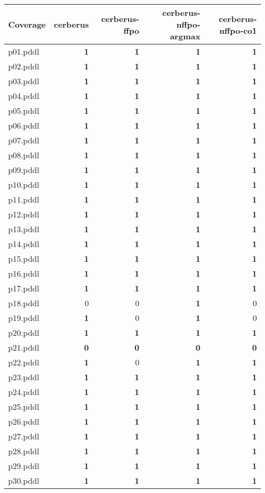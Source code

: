 \documentclass{article}
\begin{document}
\begin{tabular}{@{}lrrrr@{}}
Coverage & cerberus & cerberus-ffpo & cerberus-nffpo-argmax & cerberus-nffpo-co1 \\
\midrule
p01.pddl & \textbf{1} & \textbf{1} & \textbf{1} & \textbf{1} \\
p02.pddl & \textbf{1} & \textbf{1} & \textbf{1} & \textbf{1} \\
p03.pddl & \textbf{1} & \textbf{1} & \textbf{1} & \textbf{1} \\
p04.pddl & \textbf{1} & \textbf{1} & \textbf{1} & \textbf{1} \\
p05.pddl & \textbf{1} & \textbf{1} & \textbf{1} & \textbf{1} \\
p06.pddl & \textbf{1} & \textbf{1} & \textbf{1} & \textbf{1} \\
p07.pddl & \textbf{1} & \textbf{1} & \textbf{1} & \textbf{1} \\
p08.pddl & \textbf{1} & \textbf{1} & \textbf{1} & \textbf{1} \\
p09.pddl & \textbf{1} & \textbf{1} & \textbf{1} & \textbf{1} \\
p10.pddl & \textbf{1} & \textbf{1} & \textbf{1} & \textbf{1} \\
p11.pddl & \textbf{1} & \textbf{1} & \textbf{1} & \textbf{1} \\
p12.pddl & \textbf{1} & \textbf{1} & \textbf{1} & \textbf{1} \\
p13.pddl & \textbf{1} & \textbf{1} & \textbf{1} & \textbf{1} \\
p14.pddl & \textbf{1} & \textbf{1} & \textbf{1} & \textbf{1} \\
p15.pddl & \textbf{1} & \textbf{1} & \textbf{1} & \textbf{1} \\
p16.pddl & \textbf{1} & \textbf{1} & \textbf{1} & \textbf{1} \\
p17.pddl & \textbf{1} & \textbf{1} & \textbf{1} & \textbf{1} \\
p18.pddl & 0 & 0 & \textbf{1} & 0 \\
p19.pddl & \textbf{1} & 0 & \textbf{1} & 0 \\
p20.pddl & \textbf{1} & \textbf{1} & \textbf{1} & \textbf{1} \\
p21.pddl & \textbf{0} & \textbf{0} & \textbf{0} & \textbf{0} \\
p22.pddl & \textbf{1} & 0 & \textbf{1} & \textbf{1} \\
p23.pddl & \textbf{1} & \textbf{1} & \textbf{1} & \textbf{1} \\
p24.pddl & \textbf{1} & \textbf{1} & \textbf{1} & \textbf{1} \\
p25.pddl & \textbf{1} & \textbf{1} & \textbf{1} & \textbf{1} \\
p26.pddl & \textbf{1} & \textbf{1} & \textbf{1} & \textbf{1} \\
p27.pddl & \textbf{1} & \textbf{1} & \textbf{1} & \textbf{1} \\
p28.pddl & \textbf{1} & \textbf{1} & \textbf{1} & \textbf{1} \\
p29.pddl & \textbf{1} & \textbf{1} & \textbf{1} & \textbf{1} \\
p30.pddl & \textbf{1} & \textbf{1} & \textbf{1} & \textbf{1} \\
\end{tabular}
\end{document}
